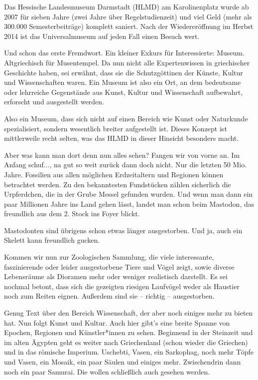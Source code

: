 {Das Hessische Landesmuseum Darmstadt (HLMD) am Karolinenplatz wurde ab 2007 für sieben Jahre (zwei Jahre über Regelstudienzeit) und viel Geld (mehr als 300.000 Semesterbeiträge) komplett saniert. Nach der Wiedereröffnung im Herbst 2014 ist das Universalmuseum auf jeden Fall einen Besuch wert.
}{Und schon das erste Fremdwort. Ein kleiner Exkurs für Interessierte: Museum. Altgriechisch für Musentempel. Da nun nicht alle Expertenwissen in griechischer Geschichte haben, sei erwähnt, dass sie die Schutzgöttinen der Künste, Kultur und Wissenschaften waren. Ein Museum ist also ein Ort, an dem bedeutsame oder lehrreiche Gegenstände aus Kunst, Kultur und Wissenschaft aufbewahrt, erforscht und ausgestellt werden.

Also ein Museum, dass sich nicht auf einen Bereich wie Kunst oder Naturkunde spezialisiert, sondern wesentlich breiter aufgestellt ist. Dieses Konzept ist mittlerweile recht selten, was das HLMD in dieser Hinsicht besonders macht.

Aber was kann man dort denn nun alles sehen? Fangen wir von vorne an. Im Anfang schuf..., na gut so weit zurück dann doch nicht. Nur die letzten 50 Mio. Jahre. Fossilien aus allen möglichen Erdzeitaltern und Regionen können betrachtet werden. Zu den bekanntesten Fundstücken zählen sicherlich die Urpferdchen, die in der Grube Messel gefunden wurden. Und wenn man dann ein paar Millionen Jahre ins Land gehen lässt, landet man schon beim Mastodon, das freundlich aus dem 2. Stock ins Foyer blickt.

Mastodonten sind übrigens schon etwas länger ausgestorben. Und ja, auch ein Skelett kann freundlich gucken.

Kommen wir nun zur Zoologischen Sammlung, die viele interessante, faszinierende oder leider ausgestorbene Tiere und Vögel zeigt, sowie diverse Lebensräume als Dioramen mehr oder weniger realistisch darstellt. Es sei nochmal betont, dass sich die gezeigten riesigen Laufvögel weder als Haustier noch zum Reiten eignen. Außerdem sind sie -- richtig -- ausgestorben.

Genug Text über den Bereich Wissenschaft, der aber noch einiges mehr zu bieten hat. Nun folgt Kunst und Kultur. Auch hier gibt's eine breite Spanne von Epochen, Regionen und Künstler*innen zu sehen. Beginnend in der Steinzeit und im alten Ägypten geht es weiter nach Griechenland (schon wieder die Griechen) und in das römische Imperium. Uschebti, Vasen, ein Sarkophag, noch mehr Töpfe und Vasen, ein Mosaik, ein paar Säulen und einiges mehr. Zwischendrin dann noch ein paar Samurai. Die wollen schließlich auch gesehen werden.

}
